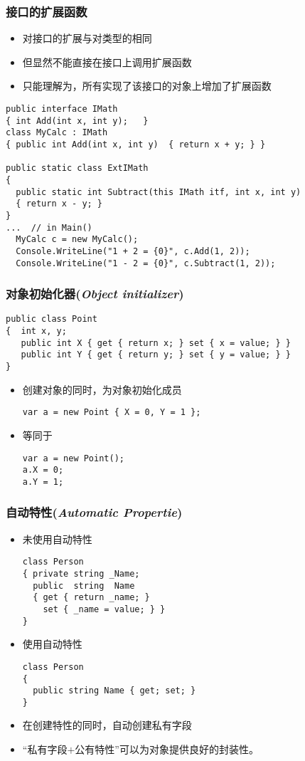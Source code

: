 \begin{frame}[fragile]
\frametitle{接口的扩展函数}
\begin{itemize}
\item 对接口的扩展与对类型的相同
\item 但显然不能直接在接口上调用扩展函数
\item 只能理解为，所有实现了该接口的对象上增加了扩展函数
\end{itemize}
\begin{lstlisting}
public interface IMath
{ int Add(int x, int y);   }
class MyCalc : IMath
{ public int Add(int x, int y)  { return x + y; } }

public static class ExtIMath
{
  public static int Subtract(this IMath itf, int x, int y)
  { return x - y; }
}
...  // in Main()
  MyCalc c = new MyCalc();
  Console.WriteLine("1 + 2 = {0}", c.Add(1, 2));
  Console.WriteLine("1 - 2 = {0}", c.Subtract(1, 2));
\end{lstlisting}
\end{frame}

\begin{frame}[fragile]
\frametitle{对象初始化器(\textit{Object initializer})}
\begin{lstlisting}
public class Point
{  int x, y;
   public int X { get { return x; } set { x = value; } }
   public int Y { get { return y; } set { y = value; } }
}
\end{lstlisting}
\begin{itemize}
\item 创建对象的同时，为对象初始化成员
\begin{lstlisting}
var a = new Point { X = 0, Y = 1 };
\end{lstlisting}
\item 等同于
\begin{lstlisting}
var a = new Point();
a.X = 0;
a.Y = 1;
\end{lstlisting}
\end{itemize}
\end{frame}

\begin{frame}[fragile]
\frametitle{自动特性(\textit{Automatic Propertie})}
\begin{itemize}
\item 未使用自动特性
\begin{lstlisting}
class Person
{ private string _Name;
  public  string  Name
  { get { return _name; }
    set { _name = value; } }
}
\end{lstlisting}
\pause
\item 使用自动特性
\begin{lstlisting}
class Person
{
  public string Name { get; set; }
}
\end{lstlisting}
\pause
\item 在创建特性的同时，自动创建私有字段
\item “私有字段$+$公有特性”可以为对象提供良好的封装性。
\end{itemize}
\end{frame}

